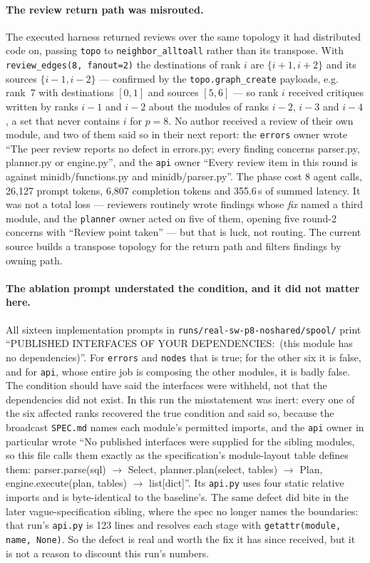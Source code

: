 \documentclass[11pt]{article}
\begin{document}
\paragraph{The review return path was misrouted.} The executed harness returned reviews over the
same topology it had distributed code on, passing \texttt{topo} to \texttt{neighbor\_alltoall}
rather than its transpose. With \texttt{review\_edges(8, fanout=2)} the destinations of rank
$i$ are $\{i{+}1, i{+}2\}$ and its sources $\{i{-}1, i{-}2\}$ --- confirmed by the
\texttt{topo.graph\_create} payloads, e.g. rank~7 with destinations $[0,1]$ and sources $[5,6]$ ---
so rank $i$ received critiques written by ranks $i{-}1$ and $i{-}2$ about the modules of ranks
$i{-}2$, $i{-}3$ and $i{-}4$, a set that never contains $i$ for $p=8$. No author received a review
of their own module, and two of them said so in their next report: the \texttt{errors} owner wrote
``The peer review reports no defect in errors.py; every finding concerns parser.py, planner.py or
engine.py'', and the \texttt{api} owner ``Every review item in this round is against
minidb/functions.py and minidb/parser.py''. The phase cost 8 agent calls, 26{,}127 prompt tokens,
6{,}807 completion tokens and 355.6\,s of summed latency. It was not a total loss --- reviewers
routinely wrote findings whose \emph{fix} named a third module, and the \texttt{planner} owner
acted on five of them, opening five round-2 concerns with ``Review point taken'' --- but that is
luck, not routing. The current source builds a transpose topology for the return path and filters
findings by owning path.

\paragraph{The ablation prompt understated the condition, and it did not matter here.} All sixteen
implementation prompts in \texttt{runs/real-sw-p8-noshared/spool/} print
``PUBLISHED INTERFACES OF YOUR DEPENDENCIES:\ (this module has no dependencies)''. For
\texttt{errors} and \texttt{nodes} that is true; for the other six it is false, and for
\texttt{api}, whose entire job is composing the other modules, it is badly false. The condition
should have said the interfaces were withheld, not that the dependencies did not exist. In this
run the misstatement was inert: every one of the six affected ranks recovered the true condition
and said so, because the broadcast \texttt{SPEC.md} names each module's permitted imports, and the
\texttt{api} owner in particular wrote ``No published interfaces were supplied for the sibling
modules, so this file calls them exactly as the specification's module-layout table defines them:
parser.parse(sql) $\rightarrow$ Select, planner.plan(select, tables) $\rightarrow$ Plan,
engine.execute(plan, tables) $\rightarrow$ list[dict]''. Its \texttt{api.py} uses four static
relative imports and is byte-identical to the baseline's. The same defect did bite in the later
vague-specification sibling, where the spec no longer names the boundaries: that run's
\texttt{api.py} is 123 lines and resolves each stage with \texttt{getattr(module, name, None)}.
So the defect is real and worth the fix it has since received, but it is not a reason to discount
this run's numbers.
\end{document}
